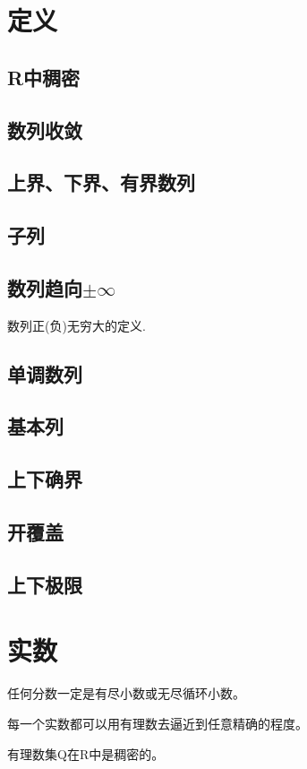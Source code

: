 \documentclass[UTF8]{ctexart}
\begin{document}
	\section{定义}
	\subsection{R中稠密}
	\subsection{数列收敛}
	\subsection{上界、下界、有界数列}
	\subsection{子列}
	\subsection{数列趋向$\pm \infty$}数列正(负)无穷大的定义.
	\subsection{单调数列}
	\subsection{基本列}
	\subsection{上下确界}
	\subsection{开覆盖}
	\subsection{上下极限}
	
	\section{实数}
	任何分数一定是有尽小数或无尽循环小数。
	
	每一个实数都可以用有理数去逼近到任意精确的程度。
	
	有理数集Q在R中是稠密的。
	
\end{document}
